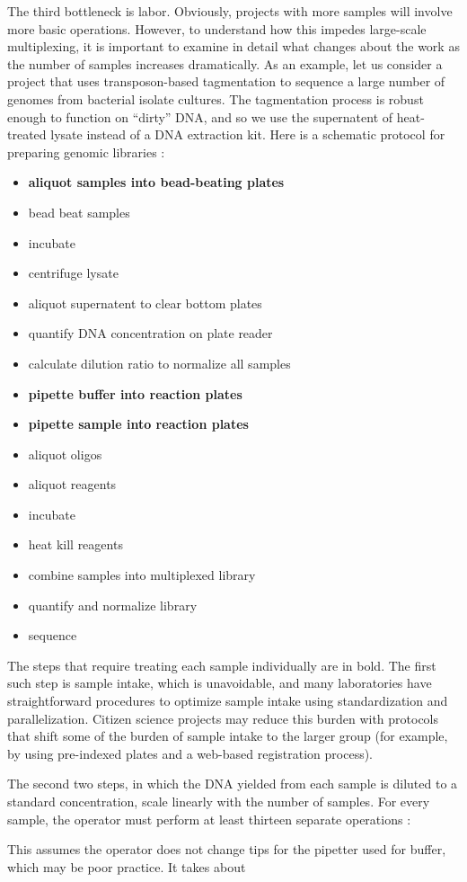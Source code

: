 \begin{refsection}
The third bottleneck is labor. Obviously, projects with more samples will involve more basic operations. However, to understand how this impedes large-scale multiplexing, it is important to examine in detail what changes about the work as the number of samples increases dramatically. As an example, let us consider a project that uses transposon-based tagmentation \cite{adey2010rapid} to sequence a large number of genomes from bacterial isolate cultures. The tagmentation process is robust enough to function on ``dirty'' DNA, and so we use the supernatent of heat-treated lysate instead of a DNA extraction kit. Here is a schematic protocol for preparing genomic libraries :

\begin{itemize}[noitemsep]
\item \textbf{aliquot samples into bead-beating plates}
\item bead beat samples
\item incubate
\item centrifuge lysate
\item aliquot supernatent to clear bottom plates
\item quantify DNA concentration on plate reader
\item calculate dilution ratio to normalize all samples
\item \textbf{pipette buffer into reaction plates}
\item \textbf{pipette sample into reaction plates}
\item aliquot oligos
\item aliquot reagents
\item incubate
\item heat kill reagents
\item combine samples into multiplexed library
\item quantify and normalize library
\item sequence
\end{itemize}

\noindent The steps that require treating each sample individually are in bold. The first such step is sample intake, which is unavoidable, and many laboratories have straightforward procedures to optimize sample intake using standardization and parallelization. Citizen science projects may reduce this burden with protocols that shift some of the burden of sample intake to the larger group (for example, by using pre-indexed plates and a web-based registration process). 

The second two steps, in which the DNA yielded from each sample is diluted to a standard concentration, scale linearly with the number of samples. For every sample, the operator must perform at least thirteen separate operations :



\noindent This assumes the operator does not change tips for the pipetter used for buffer, which may be poor practice. It takes about 


\printbibliography[heading=subbibliography]

\end{refsection}